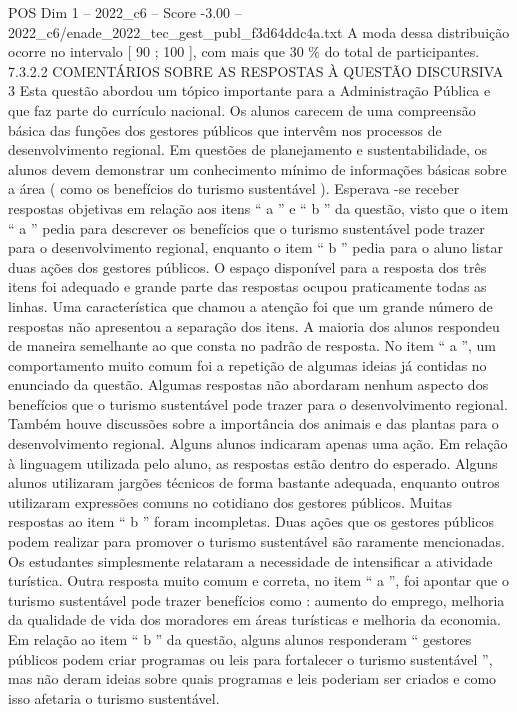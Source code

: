 \begin{textsample}{POS Dim 1 – 2022\_c6 – Score -3.00 – 2022\_c6/enade\_2022\_tec\_gest\_publ\_f3d64ddc4a.txt}
A moda dessa distribuição ocorre no intervalo [ 90 ; 100 ], com mais que 30 \% do total de participantes. 7.3.2.2 COMENTÁRIOS SOBRE AS RESPOSTAS À QUESTÃO DISCURSIVA 3 Esta questão abordou um tópico importante para a Administração Pública e que faz parte do currículo nacional.
Os alunos carecem de uma compreensão básica das funções dos gestores públicos que intervêm nos processos de desenvolvimento regional.
Em questões de planejamento e sustentabilidade, os alunos devem demonstrar um conhecimento mínimo de informações básicas sobre a área ( como os benefícios do turismo sustentável ).
Esperava -se receber respostas objetivas em relação aos itens “ a ” e “ b ” da questão, visto que o item “ a ” pedia para descrever os benefícios que o turismo sustentável pode trazer para o desenvolvimento regional, enquanto o item “ b ” pedia para o aluno listar duas ações dos gestores públicos.
O espaço disponível para a resposta dos três itens foi adequado e grande parte das respostas ocupou praticamente todas as linhas.
Uma característica que chamou a atenção foi que um grande número de respostas não apresentou a separação dos itens.
A maioria dos alunos respondeu de maneira semelhante ao que consta no padrão de resposta.
No item “ a ”, um comportamento muito comum foi a repetição de algumas ideias já contidas no enunciado da questão.
Algumas respostas não abordaram nenhum aspecto dos benefícios que o turismo sustentável pode trazer para o desenvolvimento regional.
Também houve discussões sobre a importância dos animais e das plantas para o desenvolvimento regional.
Alguns alunos indicaram apenas uma ação.
Em relação à linguagem utilizada pelo aluno, as respostas estão dentro do esperado.
Alguns alunos utilizaram jargões técnicos de forma bastante adequada, enquanto outros utilizaram expressões comuns no cotidiano dos gestores públicos.
Muitas respostas ao item “ b ” foram incompletas.
Duas ações que os gestores públicos podem realizar para promover o turismo sustentável são raramente mencionadas.
Os estudantes simplesmente relataram a necessidade de intensificar a atividade turística.
Outra resposta muito comum e correta, no item “ a ”, foi apontar que o turismo sustentável pode trazer benefícios como : aumento do emprego, melhoria da qualidade de vida dos moradores em áreas turísticas e melhoria da economia.
Em relação ao item “ b ” da questão, alguns alunos responderam “ gestores públicos podem criar programas ou leis para fortalecer o turismo sustentável ”, mas não deram ideias sobre quais programas e leis poderiam ser criados e como isso afetaria o turismo sustentável.

\end{textsample}
